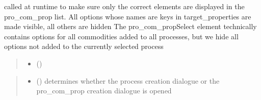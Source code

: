 \documentclass[letterpaper,10pt,english]{sphinxmanual}
\begin{document}
\begin{fulllineitems}
\label{\detokenize{docs_gui/js_api/urbs_editor/process_editor:fillSecondaryEditorList}}
\pysigstartsignatures
{}
\pysigstopsignatures
\sphinxAtStartPar
called at runtime to make sure only the correct elements are displayed in the pro\_com\_prop list. All options whose names are keys in target\_properties
are made visible, all others are hidden
The pro\_com\_propSelect element technically contains options for all commodities added to all processes, but we hide all options not added to the
currently selected process
\begin{quote}\begin{description}
\begin{itemize}
\item {} 
\sphinxAtStartPar
{} () \textendash{} 

\end{itemize}

\end{description}\end{quote}

\end{fulllineitems}


\begin{fulllineitems}
\label{\detokenize{docs_gui/js_api/urbs_editor/process_editor:openNewProcessForm}}
\pysigstartsignatures
{}
\pysigstopsignatures\begin{quote}\begin{description}
\begin{itemize}
\item {} 
\sphinxAtStartPar
{} () \textendash{} determines whether the process creation dialogue or the pro\_com\_prop creation dialogue is opened

\end{itemize}

\end{description}\end{quote}

\end{fulllineitems}
\end{document}
